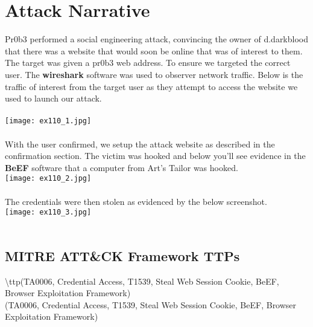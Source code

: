 \documentclass[notitlepage]{article}
\begin{document}
	\section{Attack Narrative}
	
	\indent Pr0b3 performed a social engineering attack, convincing the owner of d.darkblood that there was a website that would soon be online that was of interest to them. The target was given a pr0b3 web address. To ensure we targeted the correct user. The \textbf{wireshark} software was used to observer network traffic.  Below is the traffic of interest from the target user as they attempt to access the website we used to launch our attack. \\ \\
	\texttt{[image: ex110\_1.jpg]} \\\\
	\indent With the user confirmed, we setup the attack website as described in the confirmation section. The victim was hooked and below you'll see evidence in the \textbf{BeEF} software that a computer from Art's Tailor was hooked.\\
	\texttt{[image: ex110\_2.jpg]} \\\\
	The credentials were then stolen as evidenced by the below screenshot.\\
	\texttt{[image: ex110\_3.jpg]} \\\\
	
	
	\subsection{MITRE ATT{\&}CK Framework TTPs}
	
	\indent\textbackslash ttp(TA0006, Credential Access, T1539, Steal Web Session Cookie, BeEF, Browser Exploitation Framework) \\
	\ttp(TA0006, Credential Access, T1539, Steal Web Session Cookie, BeEF, Browser Exploitation Framework) \\
	
\end{document}
